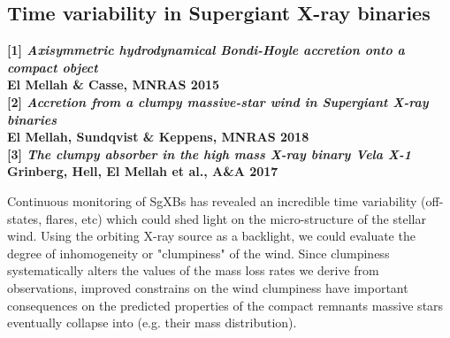 \documentclass[12pt,onecolumn]{article}
\makeatletter
\newcommand{\sgx}{SgXB\xspace}
\newcommand{\sgxs}{SgXBs\xspace}
\newcommand*{\hmxb}{HMXB\@\xspace}
\newcommand*{\eg}{e.g.\@\xspace}
\makeatother
\begin{document}
\subsection*{Time variability in Supergiant X-ray binaries}
\label{sec:summary}

\footnotesize
\textbf{[1] \textit{Axisymmetric hydrodynamical Bondi-Hoyle accretion onto a compact object}}\\
\hspace*{16pt}\textbf{El Mellah \& Casse, MNRAS 2015}\\
\textbf{[2] \textit{Accretion from a clumpy massive-star wind in Supergiant X-ray binaries}}\\
\hspace*{16pt}\textbf{El Mellah, Sundqvist \& Keppens, MNRAS 2018}\\
\textbf{[3] \textit{The clumpy absorber in the high mass X-ray binary Vela X-1}}\\
\hspace*{16pt}\textbf{Grinberg, Hell, El Mellah et al., A\&A 2017}\\

\normalsize


Continuous monitoring of \sgxs has revealed an incredible time variability (off-states, flares, etc) which could shed light on the micro-structure of the stellar wind. Using the orbiting X-ray source as a backlight, we could evaluate the degree of inhomogeneity or "clumpiness" of the wind. Since clumpiness systematically alters the values of the mass loss rates we derive from observations, improved constrains on the wind clumpiness have important consequences on the predicted properties of the compact remnants massive stars eventually collapse into (\eg their mass distribution).
\end{document}
